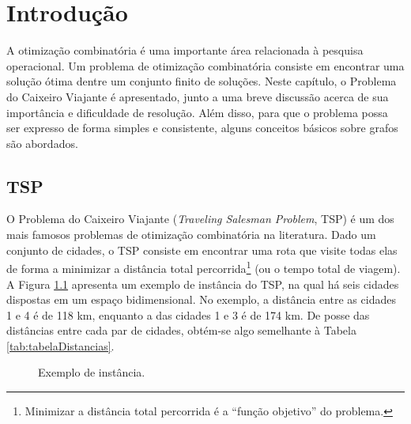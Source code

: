 \chapter{Introdução}
\thispagestyle{empty}

A otimização combinatória é uma importante área relacionada à pesquisa operacional. Um problema de otimização combinatória consiste em encontrar uma solução ótima dentre um conjunto finito de soluções. Neste capítulo, o Problema do Caixeiro Viajante é apresentado, junto a uma breve discussão acerca de sua importância e dificuldade de resolução. Além disso, para que o problema possa ser expresso de forma simples e consistente, alguns conceitos básicos sobre grafos são abordados. 

\section{TSP}
O Problema do Caixeiro Viajante (\textit{Traveling Salesman Problem}, TSP) é um dos mais famosos problemas de otimização combinatória na literatura. Dado um conjunto de cidades, o TSP consiste em encontrar uma rota que visite todas elas de forma a minimizar a distância total percorrida\footnote{Minimizar a distância total percorrida é a ``função objetivo'' do problema.} (ou o tempo total de viagem). A Figura \ref{fig:instanciaTSP} apresenta um exemplo de instância do TSP, na qual há seis cidades dispostas em um espaço bidimensional. No exemplo, a distância entre as cidades 1 e 4 é de 118 km, enquanto a das cidades 1 e 3 é de 174 km. De posse das distâncias entre cada par de cidades, obtém-se algo semelhante à Tabela \ref{tab:tabelaDistancias}.

\begin{figure}
       \centering
    \caption{Exemplo de instância.}
    \label{fig:instanciaTSP}
\end{figure}

